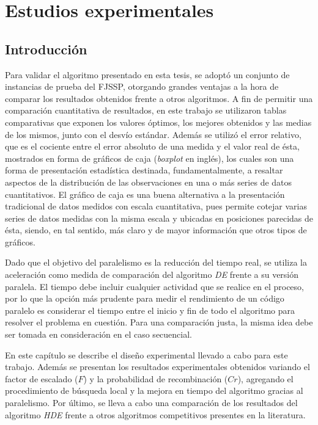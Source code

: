 \chapter{Estudios experimentales}
\section{Introducción}
Para validar el algoritmo presentado en esta tesis, se adoptó un conjunto de instancias de prueba del FJSSP, otorgando grandes ventajas a la hora de comparar los resultados obtenidos frente a otros algoritmos. A fin de permitir una comparación cuantitativa de resultados, en este trabajo se utilizaron tablas comparativas que exponen los valores óptimos, los mejores obtenidos y las medias de los mismos, junto con el desvío estándar. Además se utilizó el error relativo, que es el cociente entre el error absoluto de una medida y el valor real de ésta, mostrados en forma de gráficos de caja (\textit{boxplot} en inglés), los cuales son una forma de presentación estadística destinada, fundamentalmente, a resaltar aspectos de la distribución de las observaciones en una o más series de datos cuantitativos. El gráfico de caja es una buena alternativa a la presentación tradicional de datos medidos con escala cuantitativa, pues permite cotejar varias series de datos medidas con la misma escala y ubicadas en posiciones parecidas de ésta, siendo, en tal sentido, más claro y de mayor información que otros tipos de gráficos.


Dado que el objetivo del paralelismo es la reducción del tiempo real, se utiliza la aceleración como medida de comparación del algoritmo \textit{DE} frente a su versión paralela. El tiempo debe incluir cualquier actividad que se realice en el proceso, por lo que la opción más prudente para medir el rendimiento de un código paralelo es considerar el tiempo entre el inicio y fin de todo el algoritmo para resolver el problema en cuestión. Para una comparación justa, la misma idea debe ser tomada en consideración en el caso secuencial.


En este capítulo se describe el diseño experimental llevado a cabo para este trabajo. Además se presentan los resultados experimentales obtenidos variando el factor de escalado ($F$) y la probabilidad de recombinación ($Cr$), agregando el procedimiento de búsqueda local y la mejora en tiempo del algoritmo gracias al paralelismo. Por último, se lleva a cabo una comparación de los resultados del algoritmo \textit{HDE} frente a otros algoritmos competitivos presentes en la literatura.

